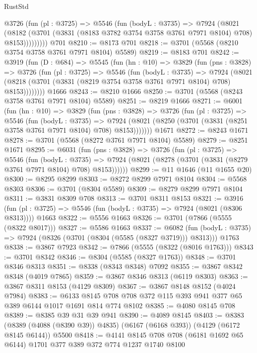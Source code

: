 \begin{lexlean}{RustStd}
\begin{coremodule}
{\begin{coremodule}
{{{{{{{{{{{{{{          @3726
            (fun (pl : @3725) =>
            @5546
              (fun (bodyL : @3735) =>
              @7924
                (@8021
                  (@8182
                    (@3701 (@3831 (@8183 @3782 @3754 @3758 @3761 @7971 @8104) @708) @8153)))))))))
    @701
@8210 := @8173 @701
@8218 := @3701 (@5568 (@8210 @3754 @3758 @3761 @7971 @8104) @5589)
@8219 := @8183 @701
@8242 := @3919
    (fun (D : @684) =>
    @5545
      (fun (hn : @10) =>
      @3829
        (fun (pns : @3828) =>
        @3726
          (fun (pl : @3725) =>
          @5546
            (fun (bodyL : @3735) =>
            @7924
              (@8021 (@8218 (@3701 (@3831 (@8219 @3754 @3758 @3761 @7971 @8104) @708) @8153))))))))
    @1666
@8243 := @8210 @1666
@8250 := @3701 (@5568 (@8243 @3758 @3761 @7971 @8104) @5589)
@8251 := @8219 @1666
@8271 := @6001
    (fun (hn : @10) =>
    @3829
      (fun (pns : @3828) =>
      @3726
        (fun (pl : @3725) =>
        @5546
          (fun (bodyL : @3735) =>
          @7924 (@8021 (@8250 (@3701 (@3831 (@8251 @3758 @3761 @7971 @8104) @708) @8153)))))))
    @1671
@8272 := @8243 @1671
@8278 := @3701 (@5568 (@8272 @3761 @7971 @8104) @5589)
@8279 := @8251 @1671
@8295 := @6031
    (fun (pns : @3828) =>
    @3726
      (fun (pl : @3725) =>
      @5546
        (fun (bodyL : @3735) =>
        @7924 (@8021 (@8278 (@3701 (@3831 (@8279 @3761 @7971 @8104) @708) @8153))))))
@8299 := @11 @1646 (@11 @1655 @20)
@8300 := @8295 @8299
@8303 := @8272 @8299 @7971 @8104
@8304 := @5568 @8303
@8306 := @3701 (@8304 @5589)
@8309 := @8279 @8299 @7971 @8104
@8311 := @3831 @8309 @708
@8313 := @3701 @8311 @8153
@8321 := @3916
    (fun (pl : @3725) => @5546 (fun (bodyL : @3735) => @7924 (@8021 (@8306 @8313))))
    @1663
@8322 := @5556 @1663
@8326 := @3701 (@7866 (@5555 (@8322 @8017)))
@8327 := @5586 @1663
@8337 := @6082
    (fun (bodyL : @3735) => @7924 (@8326 (@3701 (@8304 (@5585 (@8327 @3719))) @8313)))
    @1763
@8338 := @3867 @7923
@8342 := @7866 (@5555 (@8322 (@8016 @1763)))
@8343 := @3701 @8342
@8346 := @8304 (@5585 (@8327 @1763))
@8348 := @3701 @8346 @8313
@8351 := @8338 (@8343 @8348) @7092
@8355 := @3867 @8342 @8348 (@4019 @7865)
@8359 := @3867 @8346 @8313 (@6119 @8303)
@8363 := @3867 @8311 @8153 (@4129 @8309)
@8367 := @3867 @8148 @8152 (@4024 @7984)
@8383 := @6133 @8145 @708 @708 @372 @115 @393 @941 @377 @65 @389 @6144 @1017 @1691 @814 @774 @8102
@8385 := @4080 @8145 @708
@8389 := @8385 @39 @31 @39 @941
@8390 := @4089 @8145
@8403 := @8383
    (@8389 (@4088 (@8390 @39)) @4835)
    (@6167 (@6168 @393))
    (@4129 (@6172 @8145 @6144))
    @5500
@8418 := @4141 @8145 @708 @708 (@6181 @1692 @65 @6144) @1701 @377 @389 @372 @774 @1237 @1740 @8100
}}}}}}}}}}}}}}
\end{coremodule}}
\end{coremodule}
\end{lexlean}
